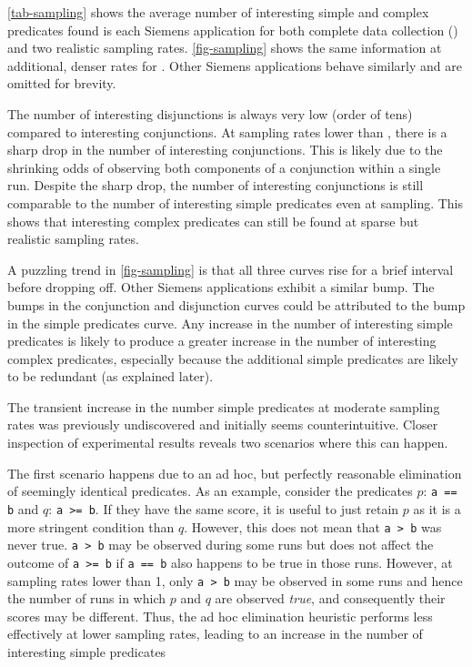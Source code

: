 \autoref{tab-sampling} shows the average number of interesting simple
and complex predicates found is each Siemens application for both
complete data collection () and two realistic sampling
rates.  \autoref{fig-sampling} shows the same information at
additional, denser rates for .  Other Siemens
applications behave similarly and are omitted for brevity.

The number of interesting disjunctions is always very low (order of
tens) compared to interesting conjunctions.  At sampling rates lower
than , there is a sharp drop in the number of
interesting conjunctions.  This is likely due to the shrinking odds of
observing both components of a conjunction within a single run.
Despite the sharp drop, the number of interesting conjunctions is
still comparable to the number of interesting simple predicates even
at  sampling.  This shows that interesting complex
predicates can still be found at sparse but realistic sampling rates.

A puzzling trend in \autoref{fig-sampling} is that all three curves
rise for a brief interval before dropping off.  Other Siemens
applications exhibit a similar bump.  The bumps in the conjunction and
disjunction curves could be attributed to the bump in the simple
predicates curve.  Any increase in the number of interesting simple
predicates is likely to produce a greater increase in the number of
interesting complex predicates, especially because the additional
simple predicates are likely to be redundant (as explained later).

The transient increase in the number simple predicates at moderate
sampling rates was previously undiscovered and initially seems
counterintuitive.  Closer inspection of experimental results reveals
two scenarios where this can happen.

The first scenario happens due to an ad hoc, but perfectly reasonable
elimination of seemingly identical predicates.  As an example, consider the
predicates $p$: \texttt{a == b} and $q$: \texttt{a >= b}.  If they have the
same score, it is useful to just retain $p$ as it is a more stringent
condition than $q$.  However, this does not mean
that \texttt{a > b} was never true.  \texttt{a > b} may be observed  during 
some runs but does not affect the outcome of \texttt{a >= b} if \texttt{a == b}
also happens to be true in those runs.  However, at sampling rates lower than
1, only \texttt{a > b} may be observed in some runs and hence the number of
runs in which $p$ and $q$ are observed \emph{true}, and consequently their
scores may be different.  Thus, the ad hoc elimination heuristic performs 
less effectively at lower sampling rates, leading to an increase in the 
number of interesting simple predicates


